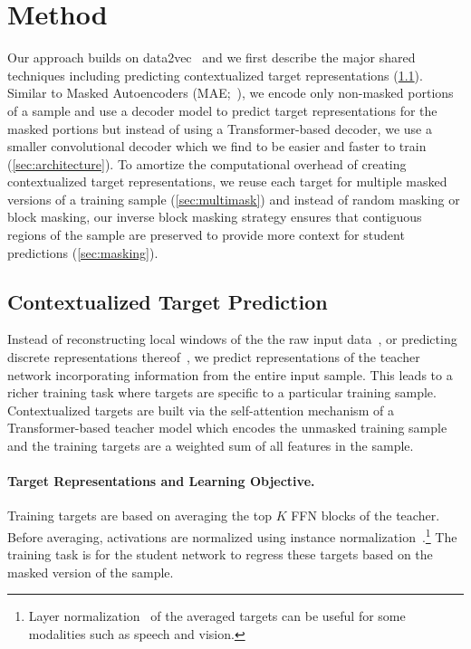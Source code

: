 \documentclass[nohyperref]{article}
\theoremstyle{plain}
\theoremstyle{definition}
\theoremstyle{remark}
\begin{document}
\section{Method}

Our approach builds on data2vec~\citep{baevski2022d2v} and we first describe the major shared techniques including predicting contextualized target representations (\textsection\ref{sec:d2v}).
Similar to Masked Autoencoders (MAE;~\citealt{he2021mae}), we encode only non-masked portions of a sample and use a decoder model to predict target representations for the masked portions but 
instead of using a Transformer-based decoder, we use a smaller convolutional decoder which we find to be easier and faster to train (\textsection\ref{sec:architecture}).
To amortize the computational overhead of creating contextualized target representations, we reuse each target for multiple masked versions of a training sample (\textsection\ref{sec:multimask}) and instead of random masking or block masking, our inverse block masking strategy ensures that contiguous regions of the sample are preserved to provide more context for student predictions (\textsection\ref{sec:masking}).


\subsection{Contextualized Target Prediction}
\label{sec:d2v}

Instead of reconstructing local windows of the the raw input data~\citep{he2021mae}, or predicting discrete representations thereof~\citep{bao2021beit}, we predict representations of the teacher network incorporating information from the entire input sample. 
This leads to a richer training task where targets are specific to a particular training sample.
Contextualized targets are built via the self-attention mechanism of a Transformer-based teacher model which encodes the unmasked training sample~\citep{paulus17intra,vaswani2017transformer} and the training targets are a weighted sum of all features in the sample.

\paragraph{Target Representations and Learning Objective.}
Training targets are based on averaging the top $K$ FFN blocks of the teacher. 
Before averaging, activations are normalized using instance normalization~\citep{ulyanov2016in}.\footnote{Layer normalization~\citep{ba2016layer} of the averaged targets can be useful for some modalities such as speech and vision.}
The training task is for the student network to regress these targets based on the masked version of the sample.
\end{document}
